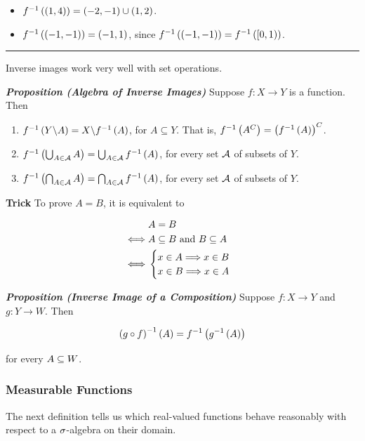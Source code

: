 \documentclass[
]{article}
\begin{document}
\begin{itemize}
\item
  \({f}^{-1}\left(\left(1,4\right)\right) = \left(-2,-1\right)\cup \left(1,2\right)\).
\item
  \({f}^{-1}\left(\left(-1,-1\right)\right) = \left(-1,1\right)\), since
  \({f}^{-1}\left(\left(-1,-1\right)\right) = {f}^{-1}\left([0,1)\right)\).
\end{itemize}

\begin{center}\rule{0.5\linewidth}{0.5pt}\end{center}

Inverse images work very well with set operations.

\emph{\textbf{Proposition (Algebra of Inverse Images)}} Suppose
\(f:X\to Y\) is a function. Then

\begin{enumerate}
\def\labelenumi{\arabic{enumi}.}
\item
  \({f}^{-1}\left(Y\backslash A\right) = X\backslash {f}^{-1}\left(A\right)\), for
  \(A\subseteq Y\). That is, \({f}^{-1}\left(A^C\right) = \left({f}^{-1}\left(A\right)\right)^C\).
\item
  \({f}^{-1}\left(\bigcup_{A\in \mathcal A} A\right) = \bigcup_{A\in \mathcal A} {f}^{-1}\left(A\right)\),
  for every set \(\mathcal A\) of subsets of \(Y\).
\item
  \({f}^{-1}\left(\bigcap_{A\in \mathcal A} A\right) = \bigcap_{A\in \mathcal A} {f}^{-1}\left(A\right)\),
  for every set \(\mathcal A\) of subsets of \(Y\).
\end{enumerate}

\textbf{Trick} To prove \(A = B\), it is equivalent to

\[\begin{aligned}
& A = B\\
\iff & A\subseteq B \text{ and }B\subseteq A\\
\iff & \begin{cases}
x\in A\Longrightarrow x\in B\\
x\in B\Longrightarrow x\in A
\end{cases}
\end{aligned}\]

\emph{\textbf{Proposition (Inverse Image of a Composition)}} Suppose
\(f:X\to Y\) and \(g:Y\to W\). Then

\[{\left(g\circ f\right)}^{-1}\left(A\right) = {f}^{-1}\left({g}^{-1}\left(A\right)\right)\]

for every \(A\subseteq W\).

\hypertarget{measurable-functions}{%
\subsubsection{Measurable Functions}\label{measurable-functions}}

The next definition tells us which real-valued functions behave
reasonably with respect to a \(\sigma\)-algebra on their domain.
\end{document}
